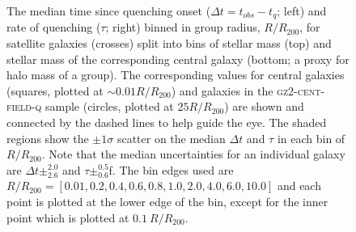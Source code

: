 \documentclass[useAMS,usenatbib]{mn2e}
\begin{document}
\begin{figure}
{\caption[Trend of $\Delta t$ and $\tau$ with group radius split by stellar mass and halo mass]{The median time since quenching onset ($\Delta t = t_{obs} - t_{q}$; left) and rate of quenching ($\tau$; right) binned in group radius, $R/R_{200}$, for satellite galaxies (crosses) split into bins of stellar mass (top) and stellar mass of the corresponding central galaxy (bottom; a proxy for halo mass of a group). The corresponding values for central galaxies (squares, plotted at $\sim0.01 R/R_{200}$) and galaxies in the \textsc{gz2-cent-field-q} sample (circles, plotted at $25 R/R_{200}$) are shown and connected by the dashed lines to help guide the eye. The shaded regions show the $\pm1\sigma$ scatter on the median $\Delta t$ and $\tau$ in each bin of $R/R_{200}$. Note that the median uncertainties for an individual galaxy are $\Delta t\pm_{2.6}^{2.0}$ and $\tau\pm_{0.6}^{0.5}$ƒ. The bin edges used are $R/R_{200} =  [0.01 ,   0.2,   0.4,   0.6,   0.8,   1.0 ,   2.0 ,   4.0 ,   6.0 ,  10.0]$ and each point is plotted at the lower edge of the bin, except for the inner point which is plotted at $0.1~R/R_{200}$.}
\label{fig:timesinceradius}}
\end{figure}
\end{document}
